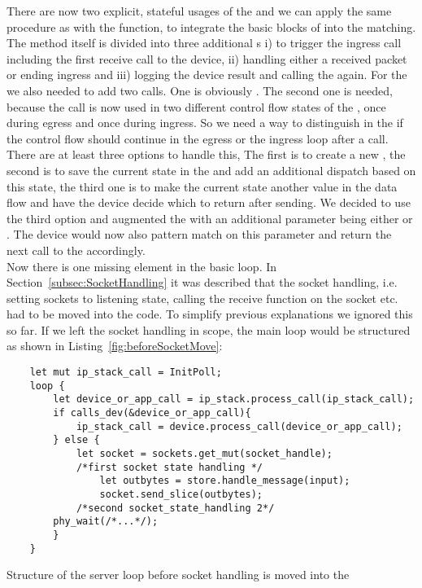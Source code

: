 There are now two explicit, stateful usages of the \dev{} and we can apply the same procedure as with the  function, to integrate the basic blocks of  into the  matching. The method itself is divided into three additional s i)  to trigger the ingress call including the first receive call to the device, ii)  handling either a received packet or ending ingress and iii)  logging the device result and calling the  again. For the \dev{} we also needed to add two calls. One is obviously . The second one is needed, because the call   is now used in two different control flow states of the \stack{}, once during egress and once during ingress. So we need a way to distinguish in the \stack{} if the control flow should continue in the egress or the ingress loop after a  call. There are at least three options to handle this, The first is to create a new , the second is to save the current state in the \stack and add an additional dispatch based on this state, the third one is to make the current state another value in the data flow and have the device decide which  to return after sending. We decided to use the third option and augmented the  with an additional parameter  being either  or . The device would now also pattern match on this parameter and return the next call to the \stack{} accordingly.\\

Now there is one missing element in the basic loop. In Section~\ref{subsec:SocketHandling} it was described that the socket handling, i.e. setting sockets to listening state, calling the receive function on the socket etc. had to be moved into the \stack{} code. To simplify previous explanations we ignored this so far. If we left the socket handling in scope, the main loop would be structured as shown in Listing~\ref{fig:beforeSocketMove}:

\begin{codefigure}
\begin{verbatim}
    let mut ip_stack_call = InitPoll;
    loop {
        let device_or_app_call = ip_stack.process_call(ip_stack_call);
        if calls_dev(&device_or_app_call){
            ip_stack_call = device.process_call(device_or_app_call);
        } else {
            let socket = sockets.get_mut(socket_handle);
            /*first socket state handling */
                let outbytes = store.handle_message(input);
                socket.send_slice(outbytes);
            /*second socket_state_handling 2*/
        phy_wait(/*...*/);
        }
    }
\end{verbatim}
\caption{Structure of the server loop before socket handling is moved into the \stack{}}
\label{fig:beforeSocketMove}
\end{codefigure}


